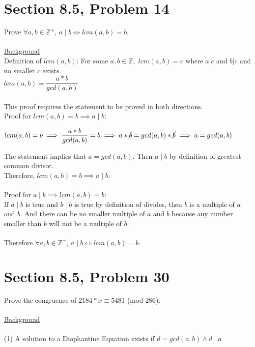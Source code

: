 \documentclass{article}
\author{Nathan Stouffer}
\begin{document}
\section*{Section 8.5, Problem 14}

Prove $\forall a,b \in \mathbb{Z}^+$, $a \mid b \iff lcm(a,b)=b$. \\\\
\underline{Background} \\
Definition of $lcm(a,b)$: For some $a,b \in \mathbb{Z},$ $lcm(a,b) = c$ where $a|c$ and $b|c$ and no smaller $c$ exists. \\
$lcm(a,b)=\dfrac{a*b}{gcd(a,b)}$ \\\\
This proof requires the statement to be proved in both directions. \\
Proof for $lcm(a,b)=b \implies a \mid b$:
\begin{center}
	$lcm(a,b)=b \implies \dfrac{a*b}{gcd(a,b)}=b \implies a*\cancel{b}=gcd(a,b)*\cancel{b} \implies a=gcd(a,b)$
\end{center}
The statement implies that $a=gcd(a,b)$. Then $a \mid b$ by definition of greatest common divisor. \\
Therefore, $lcm(a,b)=b \implies a \mid b$. \\\\
Proof for $a \mid b \implies lcm(a,b)=b$: \\
If $a\mid b$ is true and $b\mid b$ is true by definition of divides, then $b$ is a multiple of $a$ and $b$. And there can be no smaller multiple of $a$ and $b$ because any number smaller than $b$ will not be a multiple of $b$. \\\\
Therefore $\forall a,b \in \mathbb{Z}^+$, $a \mid b \iff lcm(a,b)=b$.

\clearpage
\header

\section*{Section 8.5, Problem 30}

Prove the congruence of $2184*x \equiv 5481$ (mod $286$). \\\\
\underline{Background} \\\\
(1) A solution to a Diophantine Equation exists if $d=gcd(a,b) \land d \mid a$
\end{document}
